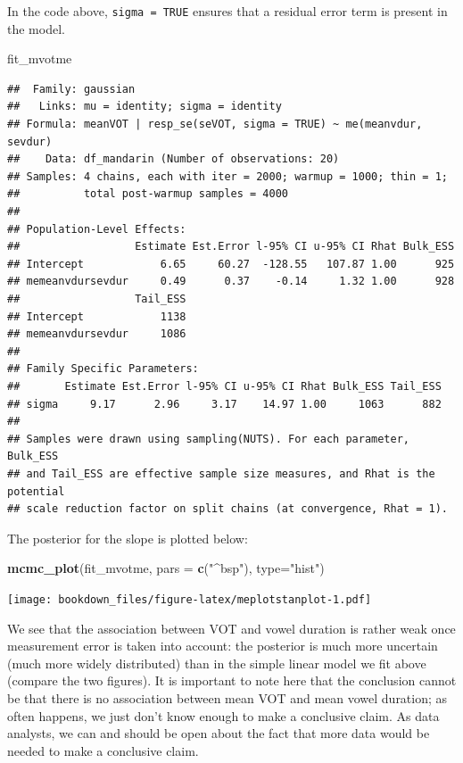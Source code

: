 \documentclass[12pt,]{krantz}
\newenvironment{Shaded}{\begin{snugshade}}{\end{snugshade}}
\newcommand{\KeywordTok}[1]{\textcolor[rgb]{0.13,0.29,0.53}{\textbf{#1}}}
\newcommand{\DataTypeTok}[1]{\textcolor[rgb]{0.13,0.29,0.53}{#1}}
\newcommand{\StringTok}[1]{\textcolor[rgb]{0.31,0.60,0.02}{#1}}
\newcommand{\NormalTok}[1]{#1}
\theoremstyle{definition}
\theoremstyle{definition}
\theoremstyle{definition}
\theoremstyle{remark}
\begin{document}
In the code above, \texttt{sigma\ =\ TRUE} ensures that a residual error
term is present in the model.

\begin{Shaded}
\begin{Highlighting}[]
\NormalTok{fit_mvotme}
\end{Highlighting}
\end{Shaded}

\begin{verbatim}
##  Family: gaussian 
##   Links: mu = identity; sigma = identity 
## Formula: meanVOT | resp_se(seVOT, sigma = TRUE) ~ me(meanvdur, sevdur) 
##    Data: df_mandarin (Number of observations: 20) 
## Samples: 4 chains, each with iter = 2000; warmup = 1000; thin = 1;
##          total post-warmup samples = 4000
## 
## Population-Level Effects: 
##                  Estimate Est.Error l-95% CI u-95% CI Rhat Bulk_ESS
## Intercept            6.65     60.27  -128.55   107.87 1.00      925
## memeanvdursevdur     0.49      0.37    -0.14     1.32 1.00      928
##                  Tail_ESS
## Intercept            1138
## memeanvdursevdur     1086
## 
## Family Specific Parameters: 
##       Estimate Est.Error l-95% CI u-95% CI Rhat Bulk_ESS Tail_ESS
## sigma     9.17      2.96     3.17    14.97 1.00     1063      882
## 
## Samples were drawn using sampling(NUTS). For each parameter, Bulk_ESS
## and Tail_ESS are effective sample size measures, and Rhat is the potential
## scale reduction factor on split chains (at convergence, Rhat = 1).
\end{verbatim}

The posterior for the slope is plotted below:

\begin{Shaded}
\begin{Highlighting}[]
\KeywordTok{mcmc_plot}\NormalTok{(fit_mvotme, }\DataTypeTok{pars =} \KeywordTok{c}\NormalTok{(}\StringTok{"^bsp"}\NormalTok{), }\DataTypeTok{type=}\StringTok{"hist"}\NormalTok{)}
\end{Highlighting}
\end{Shaded}

\texttt{[image: bookdown\_files/figure-latex/meplotstanplot-1.pdf]}

We see that the association between VOT and vowel duration is rather
weak once measurement error is taken into account: the posterior is much
more uncertain (much more widely distributed) than in the simple linear
model we fit above (compare the two figures). It is important to note
here that the conclusion cannot be that there is no association between
mean VOT and mean vowel duration; as often happens, we just don't know
enough to make a conclusive claim. As data analysts, we can and should
be open about the fact that more data would be needed to make a
conclusive claim.
\end{document}
